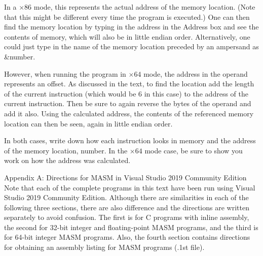 \documentclass[10pt]{book}
\begin{document}
In a $\times 86$ mode, this represents the actual address of the memory location. (Note that this might be different every time the program is executed.) One can then find the memory location by typing in the address in the Address box and see the contents of memory, which will also be in little endian order. Alternatively, one could just type in the name of the memory location preceded by an ampersand as \&number.

However, when running the program in $\times 64$ mode, the address in the operand represents an offset. As discussed in the text, to find the location add the length of the current instruction (which would be 6 in this case) to the address of the current instruction. Then be sure to again reverse the bytes of the operand and add it also. Using the calculated address, the contents of the referenced memory location can then be seen, again in little endian order.

In both cases, write down how each instruction looks in memory and the address of the memory location, number. In the $\times 64$ mode case, be sure to show you work on how the address was calculated.

Appendix A: Directions for MASM in Visual Studio 2019 Community Edition
Note that each of the complete programs in this text have been run using Visual Studio 2019 Community Edition. Although there are similarities in each of the following three sections, there are also difference and the directions are written separately to avoid confusion. The first is for C programs with inline assembly, the second for 32-bit integer and floating-point MASM programs, and the third is for 64-bit integer MASM programs. Also, the fourth section contains directions for obtaining an assembly listing for MASM programs (.1st file).
\end{document}
